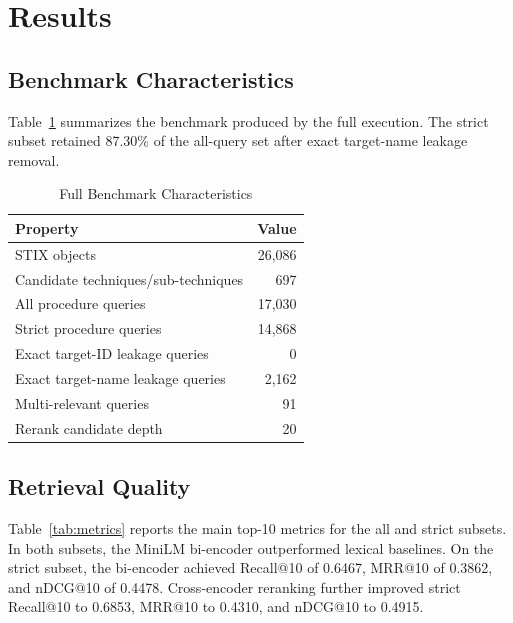\documentclass[conference]{IEEEtran}
\begin{document}
\section{Results}
\label{sec:results}
\subsection{Benchmark Characteristics}
Table~\ref{tab:dataset} summarizes the benchmark produced by the full execution. The strict subset retained 87.30\% of the all-query set after exact target-name leakage removal.

\begin{table}[htbp]
\caption{Full Benchmark Characteristics}
\label{tab:dataset}
\centering
\begin{tabular}{lr}
\toprule
\textbf{Property} & \textbf{Value} \\
\midrule
STIX objects & 26,086 \\
Candidate techniques/sub-techniques & 697 \\
All procedure queries & 17,030 \\
Strict procedure queries & 14,868 \\
Exact target-ID leakage queries & 0 \\
Exact target-name leakage queries & 2,162 \\
Multi-relevant queries & 91 \\
Rerank candidate depth & 20 \\
\bottomrule
\end{tabular}
\end{table}

\subsection{Retrieval Quality}
Table~\ref{tab:metrics} reports the main top-10 metrics for the all and strict subsets. In both subsets, the MiniLM bi-encoder outperformed lexical baselines. On the strict subset, the bi-encoder achieved Recall@10 of 0.6467, MRR@10 of 0.3862, and nDCG@10 of 0.4478. Cross-encoder reranking further improved strict Recall@10 to 0.6853, MRR@10 to 0.4310, and nDCG@10 to 0.4915.
\end{document}
